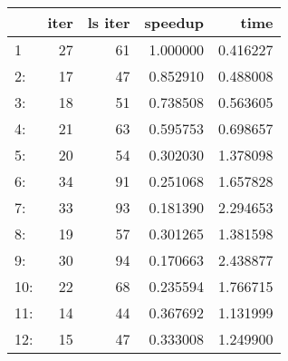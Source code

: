 \begin{tabular}{lrrrr}
\toprule
{} &  iter &  ls iter &   speedup &      time \\
\midrule
1   &    27 &       61 &  1.000000 &  0.416227 \\
2:  &    17 &       47 &  0.852910 &  0.488008 \\
3:  &    18 &       51 &  0.738508 &  0.563605 \\
4:  &    21 &       63 &  0.595753 &  0.698657 \\
5:  &    20 &       54 &  0.302030 &  1.378098 \\
6:  &    34 &       91 &  0.251068 &  1.657828 \\
7:  &    33 &       93 &  0.181390 &  2.294653 \\
8:  &    19 &       57 &  0.301265 &  1.381598 \\
9:  &    30 &       94 &  0.170663 &  2.438877 \\
10: &    22 &       68 &  0.235594 &  1.766715 \\
11: &    14 &       44 &  0.367692 &  1.131999 \\
12: &    15 &       47 &  0.333008 &  1.249900 \\
\bottomrule
\end{tabular}
